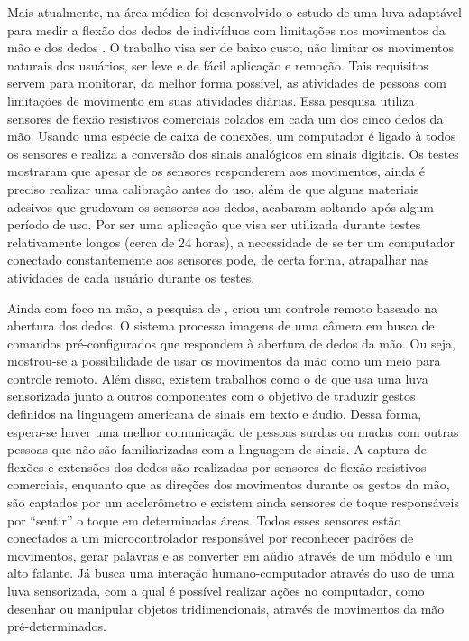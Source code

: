 \documentclass[
	12pt,				%
	openright,			%
	oneside,			%
	a4paper,			%
	english,			%
	brazil				%
	]{abntex2}
\begin{document}
		Mais atualmente, na área médica foi desenvolvido o estudo de uma luva adaptável para medir a flexão dos dedos de indivíduos com limitações nos movimentos da mão e dos dedos \cite{simone2004lowcost}. O trabalho visa ser de baixo custo, não limitar os movimentos naturais dos usuários, ser leve e de fácil aplicação e remoção. Tais requisitos servem para monitorar, da melhor forma possível, as atividades de pessoas com limitações de movimento em suas atividades diárias. Essa pesquisa utiliza sensores de flexão resistivos comerciais colados em cada um dos cinco dedos da mão. Usando uma espécie de caixa de conexões, um computador é ligado à todos os sensores e realiza a conversão dos sinais analógicos em sinais digitais. Os testes mostraram que apesar de os sensores responderem aos movimentos, ainda é preciso realizar uma calibração antes do uso, além de que alguns materiais adesivos que grudavam os sensores aos dedos, acabaram soltando após algum período de uso. Por ser uma aplicação que visa ser utilizada durante testes relativamente longos (cerca de 24 horas), a necessidade de se ter um computador conectado constantemente aos sensores pode, de certa forma, atrapalhar nas atividades de cada usuário durante os testes.		
		
		Ainda com foco na mão, a pesquisa de \cite{daeholee2009vision}, criou um controle remoto baseado na abertura dos dedos. O sistema processa imagens de uma câmera em busca de comandos pré-configurados que respondem à abertura de dedos da mão. Ou seja, mostrou-se a possibilidade de usar os movimentos da mão como um meio para controle remoto. Além disso, existem trabalhos como o de \cite{anbarasi2013deafmute} que usa uma luva sensorizada junto a outros componentes com o objetivo de traduzir gestos definidos na linguagem americana de sinais em texto e áudio. Dessa forma, espera-se haver uma melhor comunicação de pessoas surdas ou mudas com outras pessoas que não são familiarizadas com a linguagem de sinais. A captura de flexões e extensões dos dedos são realizadas por sensores de flexão resistivos comerciais, enquanto que as direções dos movimentos durante os gestos da mão, são captados por um acelerômetro e existem ainda sensores de toque responsáveis por ``sentir'' o toque em determinadas áreas. Todos esses sensores estão conectados a um microcontrolador responsável por reconhecer padrões de movimentos, gerar palavras e as converter em aúdio através de um módulo e um alto falante. Já \cite{kumar2012hci} busca uma interação humano-computador através do uso de uma luva sensorizada, com a qual é possível realizar ações no computador, como desenhar ou manipular objetos tridimencionais, através de movimentos da mão pré-determinados.
		
\end{document}
